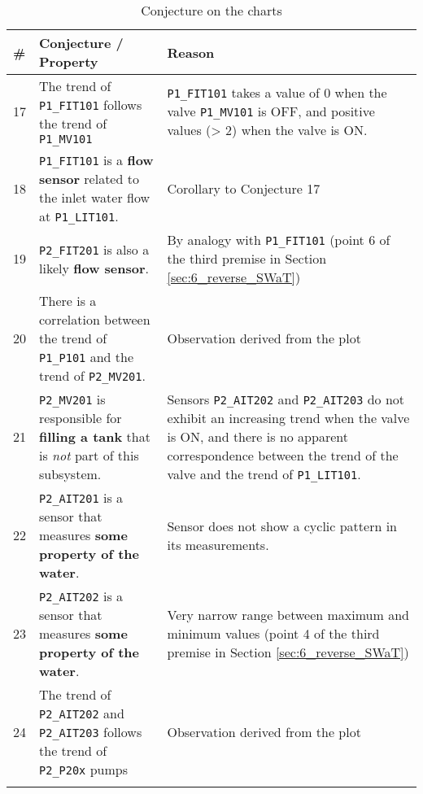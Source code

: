 {
	\small
	\begin{longtable}[l]{p{} p{} p{}}
		\hline
		\textbf{\#} & \textbf{Conjecture / Property} & \textbf{Reason} \\
		\hline
		17 & The trend of \texttt{P1\_FIT101} follows the trend of \texttt{P1\_MV101} & \texttt{P1\_FIT101} takes a value of 0 when the valve \texttt{P1\_MV101} is OFF, and positive values (> 2) when the valve is ON.\\
		\hline
		
		18 & \texttt{P1\_FIT101} is a \textbf{flow sensor} related to the inlet water flow at \texttt{P1\_LIT101}. & Corollary to Conjecture 17\\ 
		\hline
		
		19 & \texttt{P2\_FIT201} is also a likely \textbf{flow sensor}. & By analogy with \texttt{P1\_FIT101} (point 6 of the third premise in Section \ref{sec:6_reverse_SWaT})\\ 
		\hline
		
		20 & There is a correlation between the trend of \texttt{P1\_P101} and the trend of \texttt{P2\_MV201}. & Observation derived from the plot\\ 
		\hline
		
		21 & \texttt{P2\_MV201} is responsible for \textbf{filling a tank} that is \textit{not} part of this subsystem. & Sensors \texttt{P2\_AIT202} and \texttt{P2\_AIT203} do not exhibit an increasing trend when the valve is ON, and there is no apparent correspondence between the trend of the valve and the trend of \texttt{P1\_LIT101}.\\ 
		\hline
		
		22 & \texttt{P2\_AIT201} is a sensor that measures \textbf{some property of the water}. & Sensor does not show a cyclic pattern in its measurements.\\
		\hline
		
		23 & \texttt{P2\_AIT202} is a sensor that measures \textbf{some property of the water}. & Very narrow range between maximum and minimum values (point 4 of the third premise in Section \ref{sec:6_reverse_SWaT})\\
		\hline
		
		24 & The trend of \texttt{P2\_AIT202} and \texttt{P2\_AIT203} follows the trend of \texttt{P2\_P20x} pumps & Observation derived from the plot\\ 
		\hline
		
		\caption{Conjecture on the charts}
		\label{table:6_p1p2_graph_conj_1}
	\end{longtable}
}

